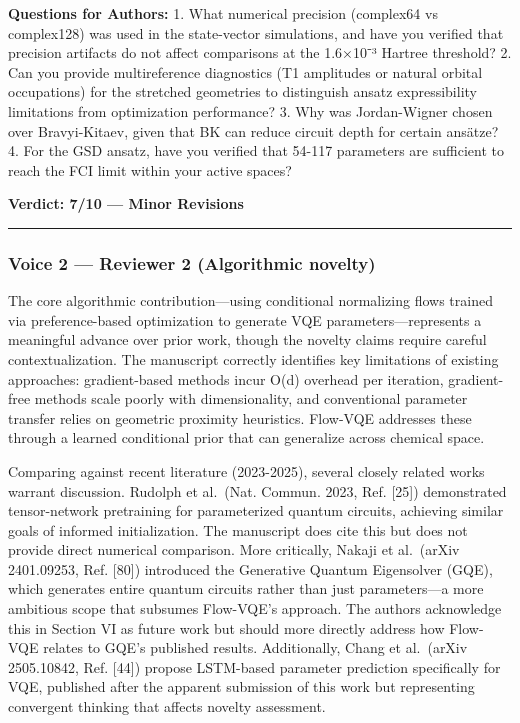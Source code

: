 \documentclass[10pt,letterpaper]{article}
\begin{document}
\textbf{Questions for Authors:}
1. What numerical precision (complex64 vs complex128) was used in the state-vector simulations, and have you verified that precision artifacts do not affect comparisons at the 1.6×10⁻³ Hartree threshold?
2. Can you provide multireference diagnostics (T1 amplitudes or natural orbital occupations) for the stretched geometries to distinguish ansatz expressibility limitations from optimization performance?
3. Why was Jordan-Wigner chosen over Bravyi-Kitaev, given that BK can reduce circuit depth for certain ansätze?
4. For the GSD ansatz, have you verified that 54-117 parameters are sufficient to reach the FCI limit within your active spaces?

\textbf{Verdict: 7/10 --- Minor Revisions}

\begin{center}\rule{0.5\linewidth}{0.5pt}\end{center}

\hypertarget{voice-2-reviewer-2-algorithmic-novelty}{%
\subsubsection{Voice 2 --- Reviewer 2 (Algorithmic novelty)}\label{voice-2-reviewer-2-algorithmic-novelty}}

The core algorithmic contribution---using conditional normalizing flows trained via preference-based optimization to generate VQE parameters---represents a meaningful advance over prior work, though the novelty claims require careful contextualization. The manuscript correctly identifies key limitations of existing approaches: gradient-based methods incur O(d) overhead per iteration, gradient-free methods scale poorly with dimensionality, and conventional parameter transfer relies on geometric proximity heuristics. Flow-VQE addresses these through a learned conditional prior that can generalize across chemical space.

Comparing against recent literature (2023-2025), several closely related works warrant discussion. Rudolph et al.~(Nat. Commun. 2023, Ref. {[}25{]}) demonstrated tensor-network pretraining for parameterized quantum circuits, achieving similar goals of informed initialization. The manuscript does cite this but does not provide direct numerical comparison. More critically, Nakaji et al.~(arXiv 2401.09253, Ref. {[}80{]}) introduced the Generative Quantum Eigensolver (GQE), which generates entire quantum circuits rather than just parameters---a more ambitious scope that subsumes Flow-VQE's approach. The authors acknowledge this in Section VI as future work but should more directly address how Flow-VQE relates to GQE's published results. Additionally, Chang et al.~(arXiv 2505.10842, Ref. {[}44{]}) propose LSTM-based parameter prediction specifically for VQE, published after the apparent submission of this work but representing convergent thinking that affects novelty assessment.
\end{document}
